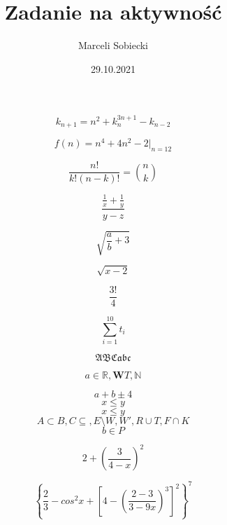 \documentclass[12pt,legalpaper,notitlepage]{article}
\title{Zadanie na aktywność}
\author{Marceli Sobiecki}
\date{29.10.2021}
\begin{document}
\maketitle

$$k_{n+1}= n^2+k^{3n+1}_n-k_{n-2}$$

$$f(n)=n^4+4n^2-2|_{n=12}$$

$$\frac {n!} {k!(n-k)!}=\binom{n}{k}$$

$$\frac {\frac {1} {x}+ \frac {1}{y}} {y-z}$$

$$\sqrt {\frac {a} {b} + 3}$$

$$\sqrt {x-2}$$

$$\frac {3!} {4}$$

$$\sum_{i=1}^{10} t_i$$

$$\mathfrak{ABCabc}$$

$$ a\in \mathbb{R}, \mathbf{W} T,\mathbb{N} $$

$$a+b\pm 4$$
$$x\leq y$$
$$x \leqslant y$$
$$A\subset B, C \subseteq , E \setminus W, W', R \cup T, F \cap K$$
$$b \in P$$



$$2+\left(\frac{3}{4-x}\right)^2$$

$$\left\{\frac {2}{3}-cos^2x+\left[4-\left(\frac{2-3}{3-9x}\right)^3\right]^2\right\}^7$$
\end{document}
